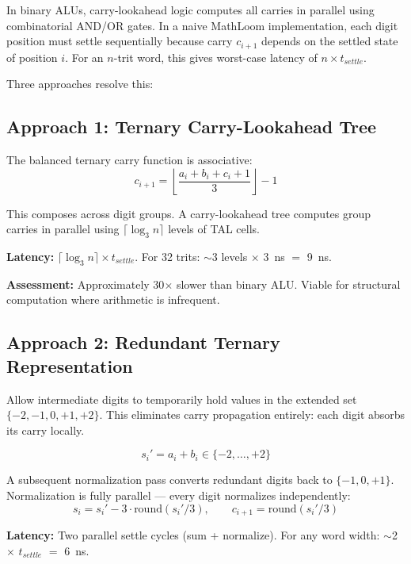 \documentclass[11pt, a4paper]{report}
\begin{document}
In binary ALUs, carry-lookahead logic computes all carries in parallel
using combinatorial AND/OR gates. In a naive MathLoom implementation,
each digit position must settle sequentially because carry $c_{i+1}$
depends on the settled state of position $i$. For an $n$-trit word,
this gives worst-case latency of $n \times t_{settle}$.

Three approaches resolve this:

\subsection{Approach 1: Ternary Carry-Lookahead Tree}

The balanced ternary carry function is associative:
\begin{equation}
  c_{i+1} = \left\lfloor \frac{a_i + b_i + c_i + 1}{3} \right\rfloor - 1
\end{equation}

This composes across digit groups. A carry-lookahead tree computes group
carries in parallel using $\lceil \log_3 n \rceil$ levels of TAL cells.

\textbf{Latency:} $\lceil \log_3 n \rceil \times t_{settle}$.
For 32 trits: $\sim$3 levels $\times$ 3~ns $=$ 9~ns.

\textbf{Assessment:} Approximately 30$\times$ slower than binary ALU.
Viable for structural computation where arithmetic is infrequent.

\subsection{Approach 2: Redundant Ternary Representation}

Allow intermediate digits to temporarily hold values in the extended set
$\{-2, -1, 0, +1, +2\}$. This eliminates carry propagation entirely:
each digit absorbs its carry locally.

\begin{equation}
  s_i' = a_i + b_i \in \{-2, \ldots, +2\}
\end{equation}

A subsequent normalization pass converts redundant digits back to
$\{-1, 0, +1\}$. Normalization is fully parallel --- every digit
normalizes independently:
\begin{equation}
  s_i = s_i' - 3 \cdot \text{round}(s_i'/3), \qquad
  c_{i+1} = \text{round}(s_i'/3)
\end{equation}

\textbf{Latency:} Two parallel settle cycles (sum + normalize).
For any word width: $\sim$2 $\times$ $t_{settle}$ $=$ 6~ns.
\end{document}
